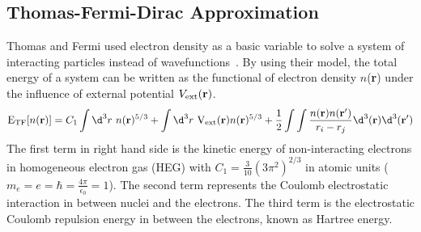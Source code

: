 \subsection{Thomas-Fermi-Dirac Approximation}
Thomas and Fermi used electron density as a basic variable to solve a system of interacting particles
instead of wavefunctions~\citep{Thomas1927, Fermi1927}. By using their model, the total energy of a system
can be written as the functional of electron density $n$({\bf r}) under the influence of external potential $V_{\rm ext}({\bf r})$.  
\begin{equation}\label{qn3}
{\rm E}_{\rm TF}[n({\bf r})] = C_1 \int\d^3r~n({\bf r})^{5/3} + \int\d^3r~{\rm V}_{\rm ext}({\bf r}) n({\bf r})^{5/3} +  \frac{1}{2}\int\int\frac{n({\bf r})n({\bf r'})}{r_{i}-r_{j}} \d^3({\bf r})\d^3({\bf r'})
\end{equation}
The first term in right hand side is the kinetic energy of non-interacting electrons in 
homogeneous electron gas (HEG) with $C_1 = \frac{3}{10} (3\pi^2)^{2/3}$ in atomic units ($m_e = e = \hbar = \frac{4\pi}{\epsilon_0} = 1$). The second term represents the Coulomb electrostatic interaction in between nuclei and the electrons. The third term is the electrostatic Coulomb repulsion energy in between the electrons, known as Hartree energy.

